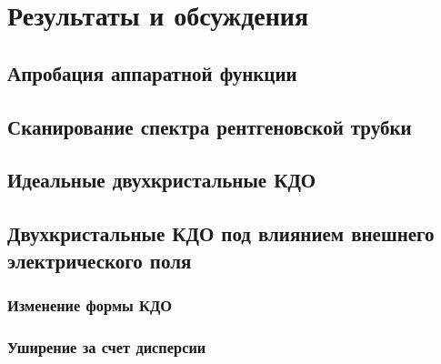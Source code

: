 \documentclass[pdftex,a4paper,14pt,english,russian]{extarticle}
\makeatletter
\numberwithin{equation}{subsection}
\def\redeflsection{\def\l@section{\@dottedtocline{1}{1.5em}{7.8em}}}
\renewcommand\appendix{\par
\setcounter{section}{0}%
\setcounter{subsection}{0}%
\def\@chapapp{\appendixname}%
\addtocontents{toc}{\protect\redeflsection}
\def\thesection{\appendixname\hspace{0.2cm}\@arabic\c@section}}
\makeatother
\begin{document}
\newpage
\section{Результаты и обсуждения}
  \subsection{Апробация аппаратной функции}
    
  \subsection{Сканирование спектра рентгеновской трубки}
      
  \subsection{Идеальные двухкристальные КДО}
    
    
    
  \subsection{Двухкристальные КДО под влиянием внешнего электрического поля}
    
    \subsubsection{Изменение формы КДО}
    \subsubsection{Уширение за счет дисперсии}


\newpage
  \begin{center}
  
  \end{center}

\newpage
\appendix
  
  
  
  
  
  
  
\end{document}

